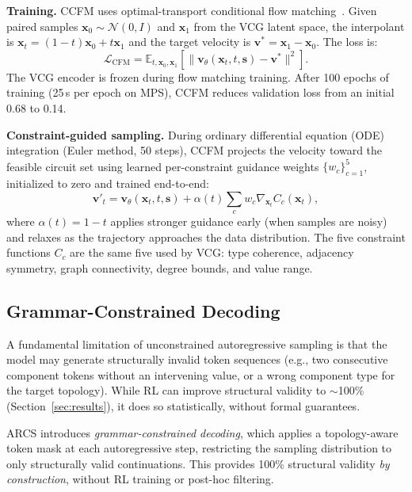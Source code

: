 \documentclass[conference]{IEEEtran}
\begin{document}
\textbf{Training.} CCFM uses optimal-transport conditional flow
matching~\cite{lipman2023flow}. Given paired samples
$\mathbf{x}_0 \sim \mathcal{N}(0,I)$ and $\mathbf{x}_1$ from the
VCG latent space, the interpolant is $\mathbf{x}_t = (1-t)\mathbf{x}_0
+ t\mathbf{x}_1$ and the target velocity is $\mathbf{v}^* =
\mathbf{x}_1 - \mathbf{x}_0$. The loss is:
\begin{equation}
\mathcal{L}_{\text{CFM}} = \mathbb{E}_{t,\mathbf{x}_0,\mathbf{x}_1}
\!\left[\|\mathbf{v}_\theta(\mathbf{x}_t, t, \mathbf{s}) -
\mathbf{v}^*\|^2\right].
\end{equation}
The VCG encoder is frozen during flow matching training. After
100 epochs of training (25\,s per epoch on MPS), CCFM reduces
validation loss from an initial 0.68 to 0.14.

\textbf{Constraint-guided sampling.} During ordinary differential
equation (ODE) integration
(Euler method, 50 steps), CCFM projects the velocity toward the feasible
circuit set using learned per-constraint guidance weights
$\{w_c\}_{c=1}^5$, initialized to zero and trained end-to-end:
\begin{equation}
\mathbf{v}'_t = \mathbf{v}_\theta(\mathbf{x}_t, t, \mathbf{s}) +
\alpha(t) \sum_c w_c \nabla_{\mathbf{x}_t} C_c(\mathbf{x}_t),
\end{equation}
where $\alpha(t) = 1 - t$ applies stronger guidance early (when
samples are noisy) and relaxes as the trajectory approaches the
data distribution. The five constraint functions $C_c$ are the same
five used by VCG: type coherence, adjacency symmetry, graph
connectivity, degree bounds, and value range.

\subsection{Grammar-Constrained Decoding}
\label{sec:constrained}

A fundamental limitation of unconstrained autoregressive sampling is
that the model may generate structurally invalid token sequences
(e.g., two consecutive component tokens without an intervening value,
or a wrong component type for the target topology). While RL can
improve structural validity to $\sim$100\% (Section~\ref{sec:results}),
it does so statistically, without formal guarantees.

ARCS introduces \emph{grammar-constrained decoding}, which applies a
topology-aware token mask at each autoregressive step, restricting
the sampling distribution to only structurally valid continuations.
This provides 100\% structural validity \emph{by construction},
without RL training or post-hoc filtering.
\end{document}
